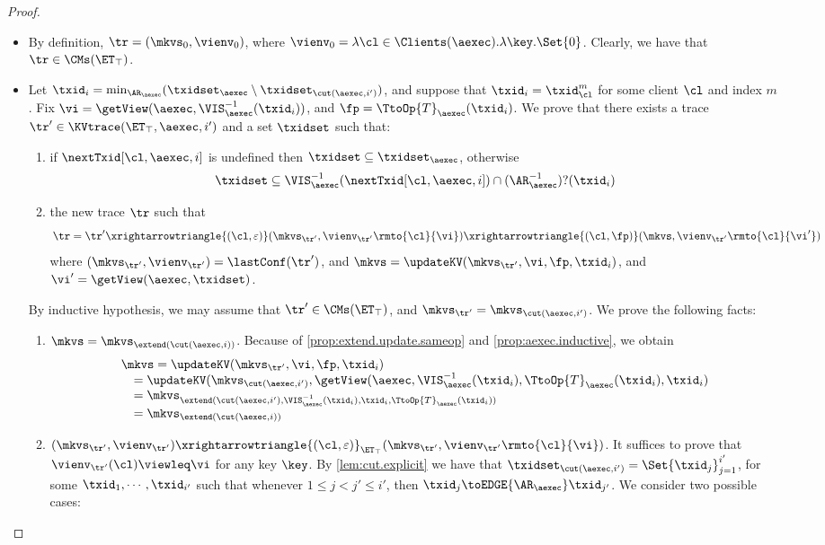 \begin{proof}
\begin{itemize}
\item {} By definition, $\tr = (\mkvs_{0}, \vienv_{0})$, 
where $\vienv_{0} = \lambda \cl \in \Clients(\aexec). \lambda \key.\Set{0}$. 
Clearly, we have that $\tr \in \CMs(\ET_{\top})$. 
\item {} Let $\txid_{i} = \min_{\AR_{\aexec}}(\txidset_{\aexec} \setminus \txidset_{\cut(\aexec, i')})$, 
and suppose that $\txid_{i} = \txid_{\cl}^{m}$ for some client $\cl$ and index $m$. 
Fix $\vi = \getView(\aexec, \VIS_{\aexec}^{-1}(\txid_{i}))$, and  $\fp = \TtoOp{T}_{\aexec}(\txid_{i})$.
We prove that there exists a trace $\tr' \in \KVtrace(\ET_{\top}, \aexec, i')$ and a set 
$\txidset$ such that: 
\begin{enumerate}
\item if $\nextTxid[\cl, \aexec, i]$ is undefined then $\txidset \subseteq \txidset_{\aexec}$, otherwise 
\[
    \txidset \subseteq \VIS^{-1}_{\aexec}(\nextTxid[\cl, \aexec, i]) \cap (\AR_{\aexec}^{-1})?(\txid_{i})
\]
\item the new trace \( \tr \) such that
\[
\tr = \tr' \xrightarrowtriangle{(\cl, \varepsilon)} (\mkvs_{\tr'}, \vienv_{\tr'}\rmto{\cl}{\vi}) \xrightarrowtriangle{(\cl, \fp)} 
(\mkvs,  \vienv_{\tr'}\rmto{\cl}{\vi'})
\]
where $(\mkvs_{\tr'}, \vienv_{\tr'}) = \lastConf(\tr')$, and $\mkvs = \updateKV(\mkvs_{\tr'}, \vi, \fp, \txid_{i})$, 
and $\vi' = \getView(\aexec, \txidset)$.
\end{enumerate}
By inductive hypothesis, we may assume that $\tr' \in \CMs(\ET_{\top})$, and $\mkvs_{\tr'} = \mkvs_{\cut(\aexec, i')}$. 
We prove the following facts: 
\begin{enumerate}
\item $\mkvs = \mkvs_{\extend(\cut(\aexec, i))}$. 
Because of \cref{prop:extend.update.sameop} and \cref{prop:aexec.inductive},
we obtain 
\[
\begin{array}{l}
\mkvs = \updateKV(\mkvs_{\tr'}, \vi, \fp, \txid_{i}) \\
\quad = \updateKV(\mkvs_{\cut(\aexec, i')}, \getView(\aexec, \VIS^{-1}_{\aexec}(\txid_{i}), \TtoOp{T}_{\aexec}(\txid_{i}), \txid_{i}) \\
\quad = \mkvs_{\extend(\cut(\aexec, i'), \VIS^{-1}_{\aexec}(\txid_{i}), \txid_{i}, \TtoOp{T}_{\aexec}(\txid_{i})) } \\
\quad = \mkvs_{\extend(\cut(\aexec, i))}
\end{array}
\]

\item $(\mkvs_{\tr'}, \vienv_{\tr'}) \xrightarrowtriangle{(\cl, \varepsilon)}_{\ET_{\top}} (\mkvs_{\tr'}, \vienv_{\tr'}\rmto{\cl}{\vi})$. 
It suffices to prove that $\vienv_{\tr'}(\cl) \viewleq \vi$ for any key $\key$.
By \cref{lem:cut.explicit} we have that $\txidset_{\cut(\aexec, i')} = \Set{\txid_{j}}_{j=1}^{i'}$, for 
some $\txid_{1},\cdots, \txid_{i'}$ such that whenever $1 \leq j < j' \leq i'$, then 
$\txid_{j} \toEDGE{\AR_{\aexec}} \txid_{j'}$. We consider two possible cases: 


\end{enumerate}
\end{itemize}
\end{proof}
